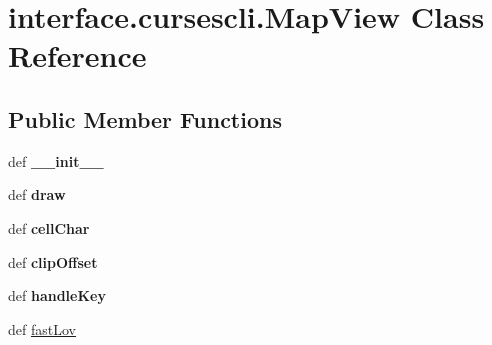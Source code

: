 \hypertarget{classinterface_1_1cursescli_1_1_map_view}{\section{interface.\-cursescli.\-Map\-View \-Class \-Reference}
\label{classinterface_1_1cursescli_1_1_map_view}
}
\subsection*{\-Public \-Member \-Functions}
\begin{DoxyCompactItemize}
\item 
\hypertarget{classinterface_1_1cursescli_1_1_map_view_ab01484a5b5c8ca9d5c779bee1ef6d710}{def {\bfseries \-\_\-\-\_\-init\-\_\-\-\_\-}}\label{classinterface_1_1cursescli_1_1_map_view_ab01484a5b5c8ca9d5c779bee1ef6d710}

\item 
\hypertarget{classinterface_1_1cursescli_1_1_map_view_a73a675f44f28cfae9a11f631fa7a972b}{def {\bfseries draw}}\label{classinterface_1_1cursescli_1_1_map_view_a73a675f44f28cfae9a11f631fa7a972b}

\item 
\hypertarget{classinterface_1_1cursescli_1_1_map_view_acf3f62c908193e8f80710f78af3ef8a6}{def {\bfseries cell\-Char}}\label{classinterface_1_1cursescli_1_1_map_view_acf3f62c908193e8f80710f78af3ef8a6}

\item 
\hypertarget{classinterface_1_1cursescli_1_1_map_view_a7365f14995f5e7edb9fe110e65080672}{def {\bfseries clip\-Offset}}\label{classinterface_1_1cursescli_1_1_map_view_a7365f14995f5e7edb9fe110e65080672}

\item 
\hypertarget{classinterface_1_1cursescli_1_1_map_view_a37487d0d1d8a28471673c3f7b456f1dc}{def {\bfseries handle\-Key}}\label{classinterface_1_1cursescli_1_1_map_view_a37487d0d1d8a28471673c3f7b456f1dc}

\item 
def \hyperlink{classinterface_1_1cursescli_1_1_map_view_aa1bdbf7ace6bbaebec6896e8742d3641}{fast\-Lov}
\end{DoxyCompactItemize}
